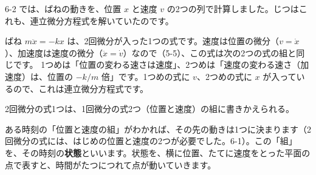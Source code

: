 
\label{bk:6-14:kaisuu}6-2 では、ばねの動きを、位置 $x$ と速度 $v$ の2つの列で計算しました。じつはこれも、連立微分方程式を解いていたのです。

ばね $m\ddot x=-kx$ は、2回微分が入った1つの式です。速度は位置の微分（$v=\dot x$）、加速度は速度の微分（$\ddot x=\dot v$）なので（5-5）、この式は次の2つの式の組と同じです。
1つめは「位置の変わる速さは速度」、2つめは「速度の変わる速さ（加速度）は、位置の $-k/m$ 倍」です。1つめの式に $v$、2つめの式に $x$ が入っているので、これは連立微分方程式です。
\begin{taisetsu}
2回微分の式1つは、1回微分の式2つ（位置と速度）の組に書きかえられる。
\end{taisetsu}

ある時刻の「位置と速度の組」がわかれば、その先の動きは1つに決まります（2回微分の式には、はじめの位置と速度の2つが必要でした。6-1）。この「組」を、その時刻の\textbf{状態}といいます。状態を、横に位置、たてに速度をとった平面の点で表すと、時間がたつにつれて点が動いていきます。

